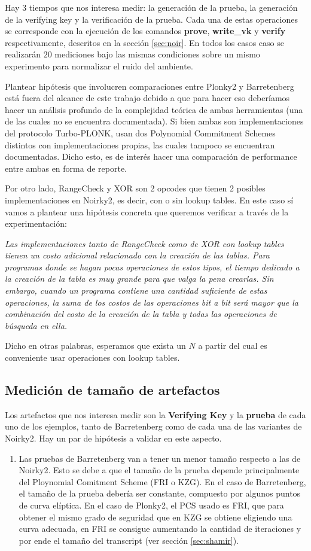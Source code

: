 \documentclass[11pt,a4paper]{tesis}
\begin{document}
Hay 3 tiempos que nos interesa medir: la generación de la prueba, la generación de la verifying key y la verificación de la prueba. Cada una de estas operaciones se corresponde con la ejecución de los comandos \textbf{prove}, \textbf{write\_vk} y \textbf{verify} respectivamente, descritos en la sección \ref{sec:noir}. En todos los casos caso se realizarán $20$ mediciones bajo las mismas condiciones sobre un mismo experimento para normalizar el ruido del ambiente. 


Plantear hipótesis que involucren comparaciones entre Plonky2 y Barretenberg está fuera del alcance de este trabajo debido a que para hacer eso deberíamos hacer un análisis profundo de la complejidad teórica de ambas herramientas (una de las cuales no se encuentra documentada). Si bien ambas son implementaciones del protocolo Turbo-PLONK, usan dos Polynomial Commitment Schemes distintos con implementaciones propias, las cuales tampoco se encuentran documentadas. Dicho esto, es de interés hacer una comparación de performance entre ambas en forma de reporte.

Por otro lado, RangeCheck y XOR son 2 opcodes que tienen 2 posibles implementaciones en Noirky2, es decir, con o sin lookup tables. En este caso sí vamos a plantear una hipótesis concreta que queremos verificar a través de la experimentación:

\textit{Las implementaciones tanto de RangeCheck como de XOR con lookup tables tienen un costo adicional relacionado con la creación de las tablas. Para programas donde se hagan pocas operaciones de estos tipos, el tiempo dedicado a la creación de la tabla es muy grande para que valga la pena crearlas. Sin embargo, cuando un programa contiene una cantidad suficiente de estas operaciones, la suma de los costos de las operaciones bit a bit será mayor que la combinación del costo de la creación de la tabla y todas las operaciones de búsqueda en ella.}

Dicho en otras palabras, esperamos que exista un $N$ a partir del cual es conveniente usar operaciones con lookup tables. 

\subsection{Medición de tamaño de artefactos}
Los artefactos que nos interesa medir son la \textbf{Verifying Key} y la \textbf{prueba} de cada uno de los ejemplos, tanto de Barretenberg como de cada una de las variantes de Noirky2. Hay un par de hipótesis a validar en este aspecto. 
\begin{enumerate}
    \item Las pruebas de Barretenberg van a tener un menor tamaño respecto a las de Noirky2. Esto se debe a que el tamaño de la prueba depende principalmente del Ploynomial Comitment Scheme (FRI o KZG). En el caso de Barretenberg, el tamaño de la prueba debería ser constante, compuesto por algunos puntos de curva elíptica. En el caso de Plonky2, el PCS usado es FRI, que para obtener el mismo grado de seguridad que en KZG se obtiene eligiendo una curva adecuada, en FRI se consigue aumentando la cantidad de iteraciones y por ende el tamaño del transcript (ver sección \ref{sec:shamir}). 
\end{enumerate}
\end{document}
